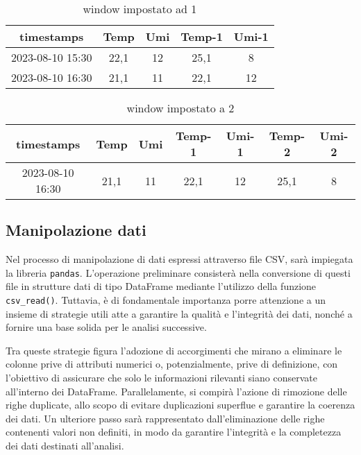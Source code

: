 \documentclass[a4paper,10pt]{article}
\begin{document}
\begin{table}[h]
  \begin{tabular}{|*{5}{c|}}
  
  \hline
  timestamps & Temp & Umi & Temp-1 & Umi-1\\
  \hline
  2023-08-10 15:30 & 22,1 & 12 & 25,1 & 8\\
  \hline
  2023-08-10 16:30 & 21,1 & 11 & 22,1 & 12\\
  \hline
  
  \end{tabular}
  
  \caption{window impostato ad 1}
\end{table}


\begin{table}[h]
  \begin{tabular}{|*{7}{c|}}
  \hline
  timestamps & Temp & Umi & Temp-1 & Umi-1 & Temp-2 & Umi-2\\
  \hline
  2023-08-10 16:30 & 21,1 & 11 & 22,1 & 12 & 25,1 & 8\\
  \hline
  
  \end{tabular}
  
  \caption{window impostato a 2}
\end{table}


\subsection{Manipolazione dati}
Nel processo di manipolazione di dati espressi attraverso file CSV, sarà impiegata la libreria  \texttt{pandas}. L'operazione preliminare 
consisterà nella conversione di questi file in strutture dati di tipo DataFrame mediante l'utilizzo della funzione  \texttt{csv\_read()}. 
Tuttavia, è di fondamentale importanza porre attenzione a un insieme di strategie utili atte a garantire la qualità e l'integrità dei dati, 
nonché a fornire una base solida per le analisi successive.

Tra queste strategie figura l'adozione di accorgimenti che mirano a eliminare le colonne prive di attributi numerici o, potenzialmente, 
prive di definizione, con l'obiettivo di assicurare che solo le informazioni rilevanti siano conservate all'interno dei DataFrame. 
Parallelamente, si compirà l'azione di rimozione delle righe duplicate, allo scopo di evitare duplicazioni superflue e garantire la coerenza dei dati. 
Un ulteriore passo sarà rappresentato dall'eliminazione delle righe contenenti valori non definiti, in modo da garantire l'integrità e la completezza 
dei dati destinati all'analisi.
\end{document}
